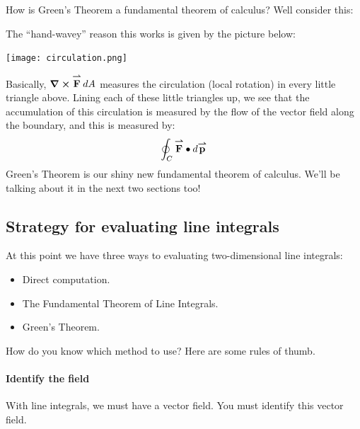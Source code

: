 \documentclass{ximera}
\begin{document}
How is Green's Theorem a fundamental theorem of calculus? Well
consider this:
\begin{image}
\end{image}
The ``hand-wavey'' reason this works is given by the picture below:
\begin{image}
  \texttt{[image: circulation.png]}
\end{image}
Basically, $\boldsymbol\nabla\boldsymbol\times {\overset{\boldsymbol{\rightharpoonup}}{\mathbf{F}}}\mathop{}\!d A$ measures the circulation (local
rotation) in every little triangle above. Lining each of these little
triangles up, we see that the accumulation of this circulation is
measured by the flow of the vector field along the boundary, and this
is measured by:
\[
\oint_C {\overset{\boldsymbol{\rightharpoonup}}{\mathbf{F}}}\bullet\mathop{}\!d{\overset{\boldsymbol{\rightharpoonup}}{\mathbf{p}}}
\]
Green's Theorem is our shiny new fundamental theorem of calculus. We'll be talking about it in the next two sections too!

\subsection{Strategy for evaluating line integrals}

At this point we have three ways to evaluating two-dimensional line
integrals:
\begin{itemize}
\item Direct computation.
\item The Fundamental Theorem of Line Integrals.
\item Green's Theorem.
\end{itemize}
How do you know which method to use? Here are some rules of thumb.

\paragraph{Identify the field}
With line integrals, we must have a vector field. You must identify this vector field. 
\end{document}

